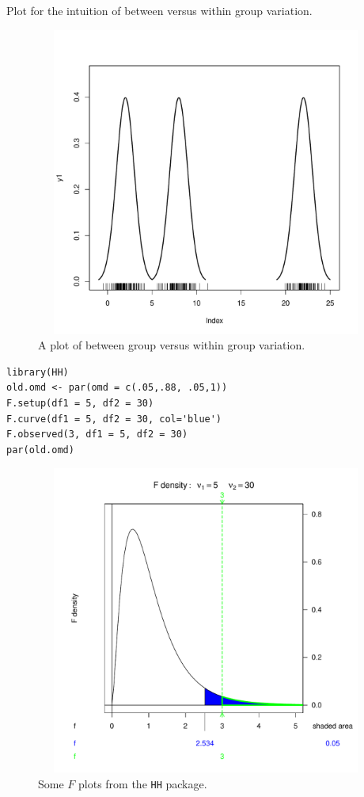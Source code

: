 \documentclass[captions=tableheading]{scrbook}
\begin{document}
Plot for the intuition of between versus within group variation.






\begin{figure}[th]
    \includegraphics[width=5in, height=4in]{img/Between-versus-within.pdf}
    \caption[Between group versus within group variation]{A plot of between group versus within group variation.}
    \label{fig:Between-versus-within}
  \end{figure}



\begin{verbatim}
library(HH)
old.omd <- par(omd = c(.05,.88, .05,1))
F.setup(df1 = 5, df2 = 30)
F.curve(df1 = 5, df2 = 30, col='blue')
F.observed(3, df1 = 5, df2 = 30)
par(old.omd)
\end{verbatim}



\begin{figure}[th]
    \includegraphics[width=5in, height=4in]{img/Some-F-plots-HH.pdf}
    \caption[Some \(F\) plots from the \texttt{HH} package]{\small Some \(F\) plots from the \texttt{HH} package.}
    \label{fig:Some-F-plots-HH}
  \end{figure}
\end{document}
